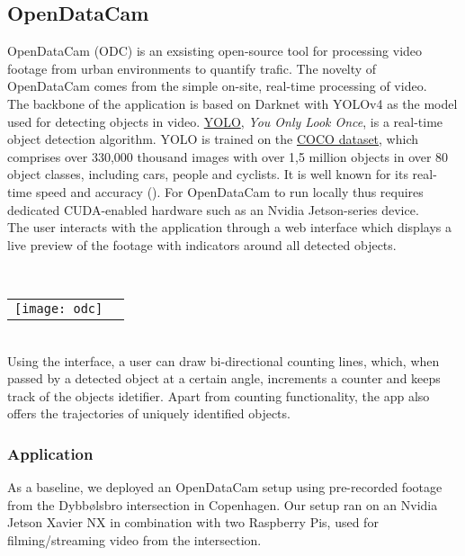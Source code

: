 \subsection{OpenDataCam}
OpenDataCam (ODC) is an exsisting open-source tool for processing video footage from urban environments to quantify
trafic. The novelty of OpenDataCam comes from the simple on-site, real-time processing of video. 
\ \\

The backbone of the application is based on Darknet with YOLOv4 as the model used for detecting objects in video.
\href{https://pjreddie.com/darknet/yolo/}{YOLO}, \textit{You Only Look Once}, is a real-time object detection algorithm. 
YOLO is trained on the \href{https://cocodataset.org}{COCO dataset}, which comprises over 330,000 thousand images
with over 1,5 million objects in over 80 object classes, including cars, people and cyclists. 
It is well known for its real-time speed and accuracy (\cite{redmon2016look}). 
For OpenDataCam to run locally thus requires dedicated CUDA-enabled hardware such as an Nvidia Jetson-series device. 
\ \\

The user interacts with the application through a web interface which displays a live preview of the footage with
indicators around all detected objects.

\ \\
\raggedbottom
\noindent
\begin{tabular}{@{}cc}
\texttt{[image: odc]} 
\end{tabular}
\ \\

Using the interface, a user can draw bi-directional counting lines, which, when passed by a detected object at a certain angle, 
increments a counter and keeps track of the objects idetifier. Apart from counting functionality, the app also offers the trajectories of uniquely identified objects. 

\raggedbottom
\subsubsection{Application}
As a baseline, we deployed an OpenDataCam setup using pre-recorded footage from the Dybbølsbro intersection in Copenhagen.
Our setup ran on an Nvidia Jetson Xavier NX in combination with two Raspberry Pis, used for filming/streaming video from the intersection.

